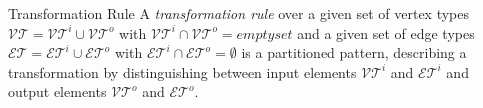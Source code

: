 \begin{definition}{Transformation Rule}
A \emph{transformation rule} over a given set of vertex types $\mathcal{VT} = \mathcal{VT}^i \cup \mathcal{VT}^o$ with $ \mathcal{VT}^i \cap \mathcal{VT}^o = emptyset$ and a given set of edge types $\mathcal{ET} =  \mathcal{ET}^i \cup \mathcal{ET}^o$ with $\mathcal{ET}^i \cap \mathcal{ET}^o = \emptyset$ is a partitioned pattern, describing a transformation by distinguishing between input elements $ \mathcal{VT}^i$ and  $\mathcal{ET}^i$ and output elements $ \mathcal{VT}^o$ and  $\mathcal{ET}^o$. 
\end{definition}

